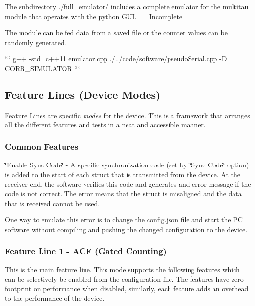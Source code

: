 \begin{DoxyItemize}
\item The subdirectory {\ttfamily ./full\+\_\+emulator}/ includes a complete emulator for the multitau module that operates with the python G\+UI. ==Incomplete==
\begin{DoxyItemize}
\item The module can be fed data from a saved file or the counter values can be randomly generated.

``` g++ -\/std=c++11 emulator.\+cpp ./../code/software/pseudo\+Serial.cpp -\/D C\+O\+R\+R\+\_\+\+S\+I\+M\+U\+L\+A\+T\+OR ```
\end{DoxyItemize}
\end{DoxyItemize}

\subsection*{Feature Lines (Device Modes)}

Feature Lines are specific {\itshape modes} for the device. This is a framework that arranges all the different features and tests in a neat and accessible manner.

\subsubsection*{Common Features}


\begin{DoxyItemize}
\item {\ttfamily \char`\"{}\+Enable Sync Code\char`\"{}} -\/ A specific synchronization code (set by {\ttfamily \char`\"{}\+Sync Code\char`\"{}} option) is added to the start of each struct that is transmitted from the device. At the receiver end, the software verifies this code and generates and error message if the code is not correct. The error means that the struct is misaligned and the data that is received cannot be used.

One way to emulate this error is to change the {\ttfamily config.\+json} file and start the PC software without compiling and pushing the changed configuration to the device.
\end{DoxyItemize}

\subsubsection*{Feature Line 1 -\/ {\ttfamily A\+CF} (Gated Counting)}

This is the main feature line. This mode supports the following features which can be selectively be enabled from the configuration file. The features have zero-\/footprint on performance when disabled, similarly, each feature adds an overhead to the performance of the device.

